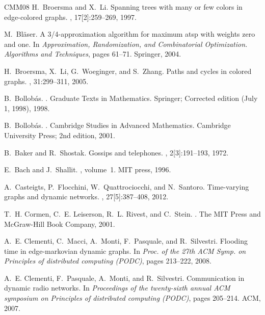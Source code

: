 \documentclass[oribibl, 11pt]{llncs}
\begin{document}
\begin{thebibliography}{CMM{\etalchar{+}}08}
H.~Broersma and X.~Li.
\newblock Spanning trees with many or few colors in edge-colored graphs.
, 17[2]:259--269, 1997.

M.~Bl{\"a}ser.
\newblock A 3/4-approximation algorithm for maximum atsp with weights zero and
  one.
\newblock In {\em Approximation, Randomization, and Combinatorial Optimization.
  Algorithms and Techniques}, pages 61--71. Springer, 2004.

H.~Broersma, X.~Li, G.~Woeginger, and S.~Zhang.
\newblock Paths and cycles in colored graphs.
, 31:299--311, 2005.

B.~Bollob{\'a}s.
.
\newblock Graduate Texts in Mathematics. Springer; Corrected edition (July 1,
  1998), 1998.

B.~Bollob{\'a}s.
.
\newblock Cambridge Studies in Advanced Mathematics. Cambridge University
  Press; 2nd edition, 2001.

B.~Baker and R.~Shostak.
\newblock Gossips and telephones.
, 2[3]:191--193, 1972.

E.~Bach and J.~Shallit.
,
  volume~1.
\newblock MIT press, 1996.

A.~Casteigts, P.~Flocchini, W.~Quattrociocchi, and N.~Santoro.
\newblock Time-varying graphs and dynamic networks.
, 27[5]:387--408, 2012.

T.~H. Cormen, C.~E. Leiserson, R.~L. Rivest, and C.~Stein.
.
\newblock The MIT Press and McGraw-Hill Book Company, 2001.

A.~E. Clementi, C.~Macci, A.~Monti, F.~Pasquale, and R.~Silvestri.
\newblock Flooding time in edge-markovian dynamic graphs.
\newblock In {\em Proc. of the 27th ACM Symp. on Principles of distributed
  computing (PODC)}, pages 213--222, 2008.

A.~E. Clementi, F.~Pasquale, A.~Monti, and R.~Silvestri.
\newblock Communication in dynamic radio networks.
\newblock In {\em Proceedings of the twenty-sixth annual ACM symposium on
  Principles of distributed computing (PODC)}, pages 205--214. ACM, 2007.


\end{thebibliography}
\end{document}
